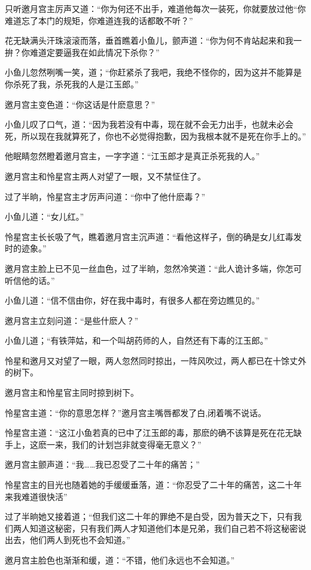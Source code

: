 \documentclass[12pt,oneside]{book}
\begin{document}
只听邀月宫主厉声又道：``你为何还不出手，难道他每次一装死，你就要放过他``你难道忘了本门的规矩，你难道连我的话都敢不听？''

花无缺满头汗珠滚滚而落，垂首瞧着小鱼儿，颤声道：``你为何不肯站起来和我一拚？你难道定要逼我在如此情况下杀你？''

小鱼儿忽然咧嘴一笑，道；``你赶紧杀了我吧，我绝不怪你的，因为这并不能算是你杀死了我，杀死我的人是江玉郎。''

邀月宫主变色道：``你这话是什麽意思？''

小鱼儿叹了口气，道：``因为我若没有中毒，现在就不会无力出手，也就未必会死，所以现在我就算死了，你也不必觉得抱歉，因为我根本就不是死在你手上的。''

他眠睛忽然瞪着邀月宫主，一字字道：``江玉郎才是真正杀死我的人。''

邀月宫主和怜星宫主两人对望了一眼，又不禁怔住了。

过了半晌，怜星宫主才厉声问道：``你中了他什麽毒？''

小鱼儿道：``女儿红。''

怜星宫主长长吸了气，瞧着邀月宫主沉声道：``看他这样子，倒的确是女儿红毒发时的迹象。''

邀月宫主脸上已不见一丝血色，过了半晌，忽然冷笑道：``此人诡计多端，你怎可听信他的话。''

小鱼儿道：``信不信由你，好在我中毒时，有很多人都在旁边瞧见的。''

邀月宫主立刻问道：``是些什麽人？''

小鱼儿道；``有铁萍姑，和一个叫胡药师的人，自然还有下毒的江玉郎。''

怜星和邀月又对望了一眼，两人忽然同时掠出，一阵风吹过，两人都已在十馀丈外的树下。

邀月宫主和怜星官主同时掠到树下。

怜星宫主道：``你的意思怎样？''邀月宫主嘴唇都发了白,闭着嘴不说话。

怜星宫主道：``这江小鱼若真的已中了江玉郎的毒，那麽的确不该算是死在花无缺手上，这麽一来，我们的计划岂非就变得毫无意义？''

邀月宫主颤声道：``我\ldots\ldots 我已忍受了二十年的痛苦；''

怜星宫主的目光也随着她的手缓缓垂落，道：``你忍受了二十年的痛苦，这二十年来我难道很快活''

过了半晌她又接着道；``但我们这二十年的罪绝不是白受，因为普天之下，只有我们两人知道这秘密，只有我们两人才知道他们本是兄弟，我们自己若不将这秘密说出去，他们两人到死也不会知道。''

邀月宫主脸色也渐渐和缓，道：``不错，他们永远也不会知道。''
\end{document}
